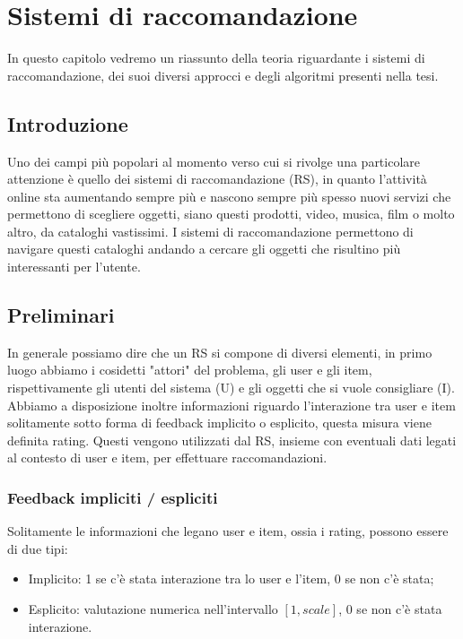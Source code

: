 
\hypertarget{(chap:capitolo3)}{}
\chapter{Sistemi di raccomandazione}
In questo capitolo vedremo un riassunto della teoria riguardante i sistemi di raccomandazione, dei suoi diversi approcci e degli algoritmi presenti nella tesi.
\section{Introduzione}
Uno dei campi più popolari al momento verso cui si rivolge una particolare attenzione è quello dei sistemi di raccomandazione (RS), in quanto l'attività online sta aumentando sempre più e nascono sempre più spesso nuovi servizi che permettono di scegliere oggetti, siano questi prodotti, video, musica, film o molto altro, da cataloghi vastissimi. I sistemi di raccomandazione permettono di navigare questi cataloghi andando a cercare gli oggetti che risultino più interessanti per l'utente.

\section{Preliminari}
In generale possiamo dire che un RS si compone di diversi elementi, in primo luogo abbiamo i cosidetti "attori" del problema, gli user e gli item, rispettivamente gli utenti del sistema (U) e gli oggetti che si vuole consigliare (I). Abbiamo a disposizione inoltre informazioni riguardo l'interazione tra user e item solitamente sotto forma di feedback implicito o esplicito, questa misura viene definita rating. Questi vengono utilizzati dal RS, insieme con eventuali dati legati al contesto di user e item, per effettuare raccomandazioni.

\subsection{Feedback impliciti / espliciti}
Solitamente le informazioni che legano user e item, ossia i rating, possono essere di due tipi:
\begin{itemize}
	\item Implicito: 1 se c'è stata interazione tra lo user e l'item, 0 se non c'è stata;
	\item Esplicito: valutazione numerica nell'intervallo $[1,scale]$, 0 se non c'è stata interazione.
\end{itemize}

